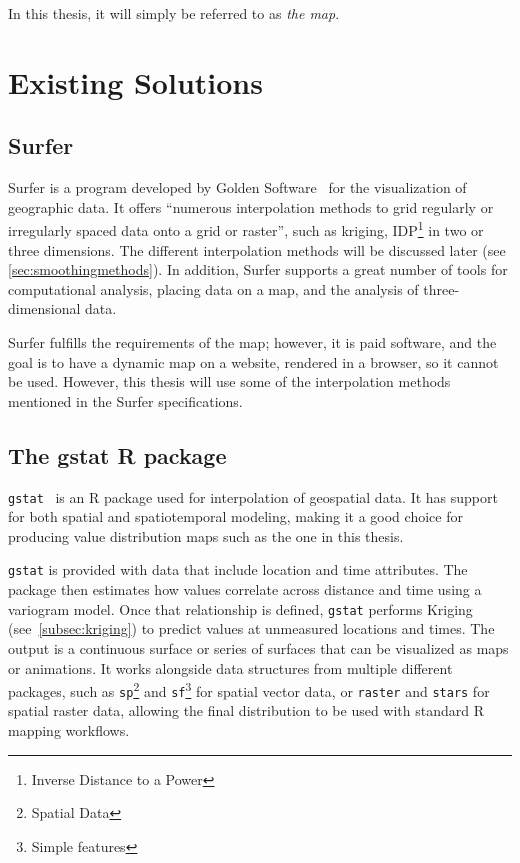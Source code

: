 In this thesis, it will simply be referred to as \emph{the map}.

\section{Existing Solutions}

\subsection{Surfer}
Surfer is a program developed by Golden Software~\cite{surfer:01} for
the visualization of geographic data. It offers ``numerous interpolation methods to
grid regularly or irregularly spaced data onto a grid or raster''\cite{surfer:02}, such as kriging, IDP\footnote{Inverse Distance to a Power} in
two or three dimensions. The different interpolation methods will be discussed
later (see \autoref{sec:smoothingmethods}). In addition, Surfer supports a great
number of tools for computational analysis, placing data on a map, and the
analysis of three-dimensional data.

Surfer fulfills the requirements of the map; however, it is paid software, and
the goal is to have a dynamic map on a website, rendered in a browser, so it
cannot be used. However, this thesis will use some of the interpolation methods
mentioned in the Surfer specifications.

\subsection{The gstat R package}
\verb|gstat|~\cite{rgstat:paper1, rgstat:paper2} is an R package used for interpolation of geospatial data. It has support for both spatial and spatiotemporal modeling, making it a good choice for producing value distribution maps such as the one in this thesis.

\verb|gstat| is provided with data that include location and time attributes. The package then estimates how values correlate across distance and time using a variogram model. Once that relationship is defined, \verb|gstat| performs Kriging (see~\autoref{subsec:kriging}) to predict values at unmeasured locations and times. The output is a continuous surface or series of surfaces that can be visualized as maps or animations. It works alongside data structures from multiple different packages, such as \verb|sp|\footnote{Spatial Data} and \verb|sf|\footnote{Simple features} for spatial vector data, or \verb|raster| and \verb|stars| for spatial raster data, allowing the final distribution to be used with standard R mapping workflows.\ \cite{r:spatialdata}

